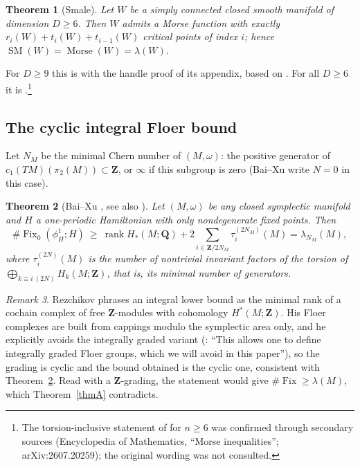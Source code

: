 \documentclass[11pt]{amsart}
\numberwithin{equation}{section}
\newtheorem{theorem}{Theorem}[section]
\theoremstyle{definition}
\theoremstyle{remark}
\newtheorem{remark}[theorem]{Remark}
\newcommand{\Z}{\mathbf Z}
\newcommand{\Q}{\mathbf Q}
\DeclareMathOperator{\SM}{SM}
\DeclareMathOperator{\Morse}{Morse}
\DeclareMathOperator{\Fix}{Fix}
\DeclareMathOperator{\rank}{rank}
\begin{document}
\begin{theorem}[Smale]\label{thm:smale}
Let $W$ be a simply connected closed smooth manifold of dimension
$D\ge 6$. Then $W$ admits a Morse function with exactly
$r_i(W)+t_i(W)+t_{i-1}(W)$ critical points of index $i$; hence
$\SM(W)=\Morse(W)=\lambda(W)$.
\end{theorem}

For $D\ge 9$ this is \cite[Thm.~2.4]{OpenAI22} with the handle proof of
its appendix, based on \cite{Smale1963}. For all $D\ge6$ it is
\cite[Thm.~6.1]{Smale1962}.\footnote{The torsion-inclusive statement of
\cite[Thm.~6.1]{Smale1962} for $n\ge6$ was confirmed through secondary
sources (Encyclopedia of Mathematics, ``Morse inequalities'';
arXiv:2607.20259); the original wording was not consulted.}

\subsection{The cyclic integral Floer bound}

Let $N_M$ be the minimal Chern number of $(M,\omega)$: the positive
generator of $c_1(TM)(\pi_2(M))\subset\Z$, or $\infty$ if this subgroup
is zero (Bai--Xu write $N=0$ in this case).

\begin{theorem}[Bai--Xu {\cite[Thm.~A]{BaiXu2022}}, see also {\cite[Cor.~1.2]{BaiXu2026}}]\label{thm:BX}
Let $(M,\omega)$ be any closed symplectic manifold and $H$ a one-periodic
Hamiltonian with only nondegenerate fixed points. Then
\[
  \#\Fix_0(\phi_H^1;H)\ \ge\ \rank H_*(M;\Q)+2\sum_{i\in\Z/2N_M}\tau_i^{(2N_M)}(M)
  =\lambda_{N_M}(M),
\]
where $\tau_i^{(2N)}(M)$ is the number of nontrivial invariant factors of
the torsion of $\bigoplus_{k\equiv i\ (2N)}H_k(M;\Z)$, that is, its
minimal number of generators.
\end{theorem}

\begin{remark}\label{rem:rezchikov}
Rezchikov \cite[Thm.~1]{Rezchikov2022} phrases an integral lower bound as
the minimal rank of a cochain complex of free $\Z$-modules with cohomology
$H^*(M;\Z)$. His Floer complexes are built from cappings modulo the
symplectic area only, and he explicitly avoids the integrally graded
variant (\cite[\S2.1, Remark~2]{Rezchikov2022}: ``This allows one to define
integrally graded Floer groups, which we will avoid in this paper''), so the
grading is cyclic and the bound obtained is the cyclic one,
consistent with Theorem~\ref{thm:BX}. Read with a $\Z$-grading, the
statement would give $\#\Fix\ge\lambda(M)$, which Theorem~\ref{thmA}
contradicts.
\end{remark}
\end{document}
